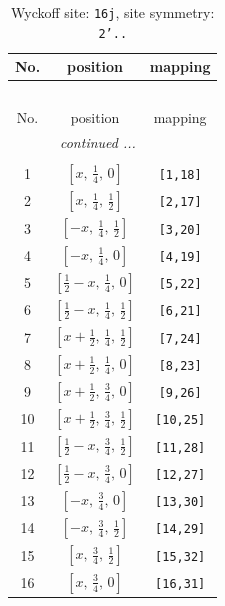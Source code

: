 \documentclass[fleqn,8pt]{jsarticle}
\begin{document}
\renewcommand{\arraystretch}{1.2}
\begin{longtable}{ccc}
\caption{Wyckoff site: {\tt 16j}, site symmetry: {\tt 2'..}}
 \\
 \hline \hline
No. & position & mapping \\ \hline \endfirsthead

\multicolumn{2}{l}{\tablename\ \thetable{}} \\
 \hline \hline
No. & position & mapping \\ \hline \endhead

 \hline \hline
\multicolumn{2}{r}{\footnotesize\it continued ...} \\ \endfoot

 \hline \hline
\multicolumn{2}{r}{} \\ \endlastfoot

1 & $\left[ x,\, \frac{1}{4},\, 0 \right]$ & {\tt [1,18]} \\ \hline
2 & $\left[ x,\, \frac{1}{4},\, \frac{1}{2} \right]$ & {\tt [2,17]} \\ \hline
3 & $\left[ - x,\, \frac{1}{4},\, \frac{1}{2} \right]$ & {\tt [3,20]} \\ \hline
4 & $\left[ - x,\, \frac{1}{4},\, 0 \right]$ & {\tt [4,19]} \\ \hline
5 & $\left[ \frac{1}{2} - x,\, \frac{1}{4},\, 0 \right]$ & {\tt [5,22]} \\ \hline
6 & $\left[ \frac{1}{2} - x,\, \frac{1}{4},\, \frac{1}{2} \right]$ & {\tt [6,21]} \\ \hline
7 & $\left[ x + \frac{1}{2},\, \frac{1}{4},\, \frac{1}{2} \right]$ & {\tt [7,24]} \\ \hline
8 & $\left[ x + \frac{1}{2},\, \frac{1}{4},\, 0 \right]$ & {\tt [8,23]} \\ \hline
9 & $\left[ x + \frac{1}{2},\, \frac{3}{4},\, 0 \right]$ & {\tt [9,26]} \\ \hline
10 & $\left[ x + \frac{1}{2},\, \frac{3}{4},\, \frac{1}{2} \right]$ & {\tt [10,25]} \\ \hline
11 & $\left[ \frac{1}{2} - x,\, \frac{3}{4},\, \frac{1}{2} \right]$ & {\tt [11,28]} \\ \hline
12 & $\left[ \frac{1}{2} - x,\, \frac{3}{4},\, 0 \right]$ & {\tt [12,27]} \\ \hline
13 & $\left[ - x,\, \frac{3}{4},\, 0 \right]$ & {\tt [13,30]} \\ \hline
14 & $\left[ - x,\, \frac{3}{4},\, \frac{1}{2} \right]$ & {\tt [14,29]} \\ \hline
15 & $\left[ x,\, \frac{3}{4},\, \frac{1}{2} \right]$ & {\tt [15,32]} \\ \hline
16 & $\left[ x,\, \frac{3}{4},\, 0 \right]$ & {\tt [16,31]} \\
\end{longtable}
\end{document}
